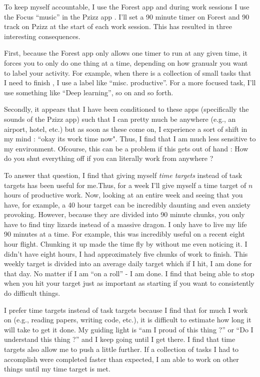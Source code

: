 \documentclass[10pt,twocolumn]{extarticle}
\begin{document}
To keep myself accountable, I use the Forest app \cite{forest_app} and during work sessions I use the Focus ``music'' in the Pzizz app \cite{pzizz}. I'll set a 90 minute timer on Forest and 90 track on Pzizz at the start of each work session. This has resulted in three interesting consequences. 

First, because the Forest app only allows one timer to run at any given time, it forces you to only do one thing at a time, depending on how granualr you want to label your activity. For example, when there is a collection of small tasks that I need to finish , I use a label like ``misc. productive''. For a more focused task, I'll use something like ``Deep learning'', so on and so forth.

Secondly, it appears that I have been conditioned to these apps (specifically the sounds of the Pzizz app) such that I can pretty much be anywhere (e.g., an airport, hotel, etc.) but as soon as these come on, I experience a sort of shift in my mind : ``okay its work time now". Thus, I find that I am much less sensitive to my environment. Ofcourse, this can be a problem if this gets out of hand : How do you shut everything off if you can literally work from anywhere ?

To answer that question, I find that giving myself \textit{time targets} instead of task targets has been useful for me.Thus, for a week I'll give myself a time target of $n$ hours of productive work. Now, looking at an entire week and seeing that you have, for example, a 40 hour target can be incredibly daunting and even anxiety provoking. However, because they are divided into 90 minute chunks, you only have to find tiny lizards instead of a massive dragon. I only have to live my life 90 minutes at a time. For example, this was incredibly useful on a recent eight hour flight. Chunking it up made the time fly by without me even noticing it. I didn't have eight hours, I had approximately five chunks of work to finish. This weekly target is divided into an average daily target which if I hit, I am done for that day. No matter if I am ``on a roll'' - I am done. I find that being able to stop when you hit your target just as important as starting if you want to consistently do difficult things.

I prefer time targets instead of task targets because I find that for much I work on (e.g., reading papers, writing code, etc.), it is difficult to estimate how long it will take to get it done. My guiding light is ``am I proud of this thing ?'' or ``Do I understand this thing ?'' and I keep going until I get there. I find that time targets also allow me to push a little further. If a collection of tasks I had to accomplish were completed faster than expected, I am able to work on other things until my time target is met.
\end{document}
